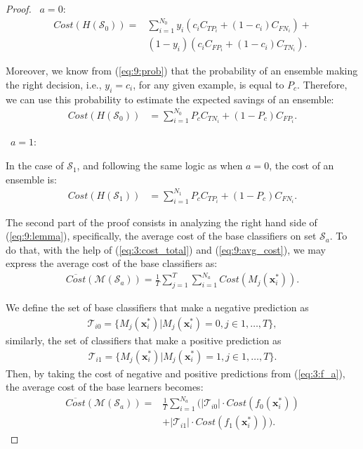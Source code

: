 {\begin{proof}
  \textbullet\ $a=0:$
  \begin{align}
  Cost(H(\mathcal{S}_0)) =& \sum_{i=1}^{N_0} y_i(c_i C_{TP_i} + (1-c_i)C_{FN_i})+ \nonumber \\  
    & (1-y_i)(c_i C_{FP_i} + (1-c_i)C_{TN_i}) . 
  \end{align}
  
  \noindent Moreover, we know from (\ref{eq:9:prob}) that the probability of an ensemble 
  making the right decision, i.e., $y_i=c_i$, for any given  example, is equal to $P_c$. 
  Therefore, we can use this probability to estimate the expected savings of an ensemble: 
  \begin{align}\label{eq:21}
    Cost(H(\mathcal{S}_0)) &= \sum_{i=1}^{N_0} P_c C_{TN_i} +(1-P_c)C_{FP_i}.
  \end{align}
  
  \textbullet\ $a=1:$
  
  \noindent In the case of $\mathcal{S}_1$, and following the same logic as when $a=0$, the cost of 
  an  ensemble is:
  \begin{align}\label{eq:22}
    Cost(H(\mathcal{S}_1)) &= \sum_{i=1}^{N_1} P_c C_{TP_i} + (1-P_c)C_{FN_i}.  
  \end{align}

  \noindent The second part of the proof consists in analyzing the right hand side of 
  (\ref{eq:9:lemma}),   specifically, the average cost of the base classifiers on set 
  $\mathcal{S}_a$. To do that, with the help of (\ref{eq:3:cost_total}) and (\ref{eq:9:avg_cost}), 
  we may express the average cost of the base classifiers as:
  \begin{align}
    \overline{Cost} (\mathcal{M}(\mathcal{S}_a)) = \frac{1}{T} \sum_{j=1}^{T} \sum_{i=1}^{N_a} 
    Cost(M_j(\mathbf{x}_i^*)).  
  \end{align} 
  
  \noindent We define the set of base classifiers that make a negative prediction as
  \begin{align}
    \mathcal{T}_{i0}=\{M_j(\mathbf{x}_i^*) \vert M_j(\mathbf{x}_i^*) = 0, j \in 1,\dots,T\},
  \end{align}
  similarly, the set of classifiers that make a positive prediction as
  \begin{align}
    \mathcal{T}_{i1}=\{M_j(\mathbf{x}_i^*) \vert M_j(\mathbf{x}_i^*) = 1, j \in 1,\dots,T\}.
  \end{align}
  Then, by taking the cost of negative and positive predictions from (\ref{eq:3:f_a}), the 
  average cost of the base learners becomes:
  \begin{align}
    \overline{Cost} (\mathcal{M}(\mathcal{S}_a)) =& 
    \frac{1}{T} \sum_{i=1}^{N_a} \bigg( \vert \mathcal{T}_{i0} \vert \cdot 
    Cost(f_0(\mathbf{x}_i^*)) \nonumber \\
    & + \vert \mathcal{T}_{i1} \vert \cdot Cost(f_1(\mathbf{x}_i^*)) \bigg).
  \end{align} 


\end{proof}}
